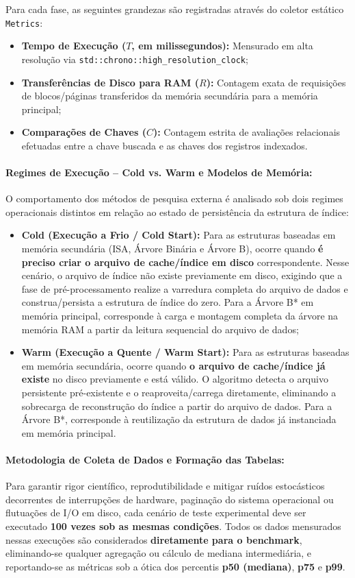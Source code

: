 \documentclass[12pt,a4paper]{article}
\begin{document}
Para cada fase, as seguintes grandezas são registradas através do coletor estático \texttt{Metrics}:
\begin{itemize}
    \item \textbf{Tempo de Execução ($T$, em milissegundos):} Mensurado em alta resolução via \texttt{std::chrono::}\allowbreak\texttt{high\_resolution\_clock};
    \item \textbf{Transferências de Disco para RAM ($R$):} Contagem exata de requisições de blocos/páginas transferidos da memória secundária para a memória principal;
    \item \textbf{Comparações de Chaves ($C$):} Contagem estrita de avaliações relacionais efetuadas entre a chave buscada e as chaves dos registros indexados.
\end{itemize}

\paragraph{Regimes de Execução -- Cold vs. Warm e Modelos de Memória:}
O comportamento dos métodos de pesquisa externa é analisado sob dois regimes operacionais distintos em relação ao estado de persistência da estrutura de índice:
\begin{itemize}
    \item \textbf{Cold (Execução a Frio / Cold Start):} Para as estruturas baseadas em memória secundária (ISA, Árvore Binária e Árvore B), ocorre quando \textbf{é preciso criar o arquivo de cache/índice em disco} correspondente. Nesse cenário, o arquivo de índice não existe previamente em disco, exigindo que a fase de pré-processamento realize a varredura completa do arquivo de dados e construa/persista a estrutura de índice do zero. Para a Árvore B* em memória principal, corresponde à carga e montagem completa da árvore na memória RAM a partir da leitura sequencial do arquivo de dados;
    \item \textbf{Warm (Execução a Quente / Warm Start):} Para as estruturas baseadas em memória secundária, ocorre quando \textbf{o arquivo de cache/índice já existe} no disco previamente e está válido. O algoritmo detecta o arquivo persistente pré-existente e o reaproveita/carrega diretamente, eliminando a sobrecarga de reconstrução do índice a partir do arquivo de dados. Para a Árvore B*, corresponde à reutilização da estrutura de dados já instanciada em memória principal.
\end{itemize}

\paragraph{Metodologia de Coleta de Dados e Formação das Tabelas:}
Para garantir rigor científico, reprodutibilidade e mitigar ruídos estocásticos decorrentes de interrupções de hardware, paginação do sistema operacional ou flutuações de I/O em disco, cada cenário de teste experimental deve ser executado \textbf{100 vezes sob as mesmas condições}. Todos os dados mensurados nessas execuções são considerados \textbf{diretamente para o benchmark}, eliminando-se qualquer agregação ou cálculo de mediana intermediária, e reportando-se as métricas sob a ótica dos percentis \textbf{p50 (mediana)}, \textbf{p75} e \textbf{p99}.
\end{document}
